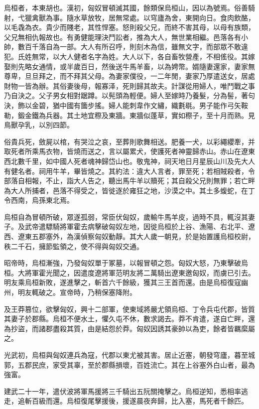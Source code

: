 
\begin{pinyinscope}
烏桓者，本東胡也。漢初，匈奴冒頓滅其國，餘類保烏桓山，因以為號焉。俗善騎射，弋獵禽獸為事。隨水草放牧，居無常處。以穹廬為舍，東開向日。食肉飲酪，以毛毳為衣。貴少而賤老，其性悍塞。怒則殺父兄，而終不害其母，以母有族類，父兄無相仇報故也。有勇健能理決鬥訟者，推為大人，無世業相繼。邑落各有小帥，數百千落自為一部。大人有所召呼，則刻木為信，雖無文字，而部眾不敢違犯。氏姓無常，以大人健者名字為姓。大人以下，各自畜牧營產，不相傜役。其嫁娶則先略女通情，或半歲百日，然後送牛馬羊畜，以為娉幣。婿隨妻還家，妻家無尊卑，旦旦拜之，而不拜其父母。為妻家僕役，一二年閒，妻家乃厚遣送女，居處財物一皆為辦。其俗妻後母，報寡泽，死則歸其故夫。計謀從用婦人，唯鬥戰之事乃自決之。父子男女相對踞蹲。以髡頭為輕便。婦人至嫁時乃養髮，分為髻，著句決，飾以金碧，猶中國有簂步搖。婦人能刺韋作文繡，織氀毼。男子能作弓矢鞍勒，鍛金鐵為兵器。其土地宜穄及東牆。東牆似蓬草，實如穄子，至十月而熟。見鳥獸孕乳，以別四節。

俗貴兵死，斂屍以棺，有哭泣之哀，至葬則歌舞相送。肥養一犬，以彩繩纓牽，并取死者所乘馬衣物，皆燒而送之，言以屬累犬，使護死者神靈歸赤山。赤山在遼東西北數千里，如中國人死者魂神歸岱山也。敬鬼神，祠天地日月星辰山川及先大人有健名者。祠用牛羊，畢皆燒之。其約法：違大人言者，罪至死；若相賊殺者，令部落自相報，不止，詣大人告之，聽出馬牛羊以贖死；其自殺父兄則無罪；若亡畔為大人所捕者，邑落不得受之，皆徙逐於雍狂之地，沙漠之中。其土多蝮蛇，在丁令西南，烏孫東北焉。

烏桓自為冒頓所破，眾遂孤弱，常臣伏匈奴，歲輸牛馬羊皮，過時不具，輒沒其妻子。及武帝遣驃騎將軍霍去病擊破匈奴左地，因徙烏桓於上谷、漁陽、右北平、遼西、遼東五郡塞外，為漢偵察匈奴動靜。其大人歲一朝見，於是始置護烏桓校尉，秩二千石，擁節監領之，使不得與匈奴交通。

昭帝時，烏桓漸強，乃發匈奴單于冢墓，以報冒頓之怨。匈奴大怒，乃東擊破烏桓。大將軍霍光聞之，因遣度遼將軍范明友將二萬騎出遼東邀匈奴，而虜已引去。明友乘烏桓新敗，遂進擊之，斬首六千餘級，獲其三王首而還。由是烏桓復寇幽州，明友輒破之。宣帝時，乃稍保塞降附。

及王莽篡位，欲擊匈奴，興十二部軍，使東域將嚴尤領烏桓、丁令兵屯代郡，皆質其妻子於郡縣。烏桓不便水土，懼久屯不休，數求謁去。莽不肯遣，遂自亡畔，還為抄盜，而諸郡盡殺其質，由是結怨於莽。匈奴因誘其豪帥以為吏，餘者皆羈縻屬之。

光武初，烏桓與匈奴連兵為寇，代郡以東尤被其害。居止近塞，朝發穹廬，暮至城郭，五郡民庶，家受其辜，至於郡縣損壞，百姓流亡。其在上谷塞外白山者，最為強富。

建武二十一年，遣伏波將軍馬援將三千騎出五阮關掩擊之。烏桓逆知，悉相率逃走，追斬百級而還。烏桓復尾擊援後，援遂晨夜奔歸，比入塞，馬死者千餘匹。


\end{pinyinscope}
